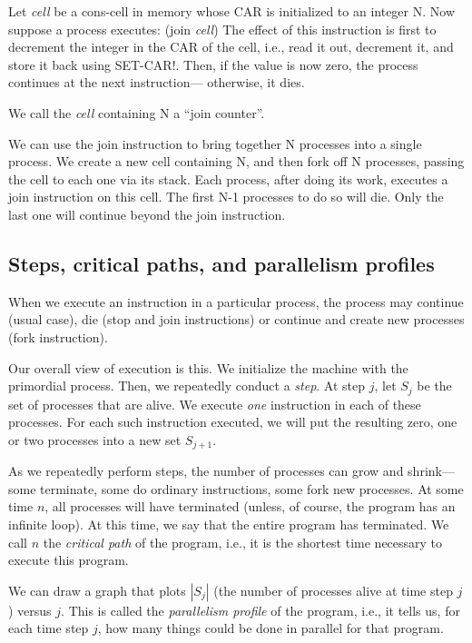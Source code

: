 Let {\em cell\/} be a cons-cell in memory whose CAR is initialized to
an integer N.  Now suppose a process executes:
\beginlisp
  (join {\em cell\/})
\endlisp
 The effect of this instruction is first to decrement the integer in
the CAR of the cell, i.e., read it out, decrement it, and store it
back using SET-CAR!.  Then, if the value is now zero, the process
continues at the next instruction--- otherwise, it dies.

We call the {\em cell} containing N a ``join counter''.

We can use the {\cf join} instruction to bring together N processes
into a single process.  We create a new cell containing N, and then
fork off N processes, passing the cell to each one via its stack.
Each process, after doing its work, executes a {\cf join} instruction
on this cell.  The first N-1 processes to do so will die.  Only the
last one will continue beyond the {\cf join} instruction.

\subsection{Steps, critical paths, and parallelism profiles}

When we execute an instruction in a particular process, the process
may continue (usual case), die ({\cf stop} and {\cf join}
instructions) or continue and create new processes ({\cf fork}
instruction).

Our overall view of execution is this.  We initialize the machine with
the primordial process.  Then, we repeatedly conduct a {\em step\/}.
At step $j$, let $S_j$ be the set of processes that are alive.  We
execute {\em one\/} instruction in each of these processes.  For each
such instruction executed, we will put the resulting zero, one or two
processes into a new set $S_{j+1}$.

As we repeatedly perform steps, the number of processes can grow and
shrink--- some terminate, some do ordinary instructions, some fork new
processes.  At some time $n$, all processes will have terminated
(unless, of course, the program has an infinite loop).  At this time,
we say that the entire program has terminated.  We call $n$ the {\em
critical path\/} of the program, i.e., it is the shortest time
necessary to execute this program.

We can draw a graph that plots $\left| S_j \right|$ (the number of
processes alive at time step $j$) versus $j$.  This is called the {\em
parallelism profile\/} of the program, i.e., it tells us, for each
time step $j$, how many things could be done in parallel for that
program.

